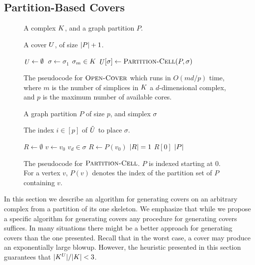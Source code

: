 \subsection{Partition-Based Covers}

\label{sec:partition-based-covers}
\label{sec:pcover}
\begin{figure}[h!]
\begin{description}
\addtolength{\itemsep}{-.65\baselineskip}
\item[\small\textbf{Input:}] \small A complex $K$, and a graph partition $P$.
\item[\small\textbf{Output:}] \small A cover $U$, of size $|P|+1$.
\end{description}
\vspace{-.6cm}
\begin{codebox}
 \li	$\id{\C} \gets \emptyset$
 \li  \Parfor\,$ \sigma \gets \sigma_1$ \To $\sigma_m \in K$
 \li 	   \Do  $\id{\C}[\sigma] \gets \proc{Partition-Cell}(P,\sigma)$
          \End
 \li \Return \id{\C}
  \End
\end{codebox}
\label{alg:open-cov}
\caption{The pseudocode for $\textnormal{\scshape Open-Cover}$ which runs in $O(md/p)$ time, where $m$ is the 
number of simplices in $K$ a $d$-dimensional complex, and $p$ is the 
maximum number of available cores.}
\end{figure}
\begin{figure}[h!]
\begin{description}
\addtolength{\itemsep}{-.65\baselineskip}
\item[\small \textbf{Input:}] \small A graph partition $P$ of size $p$, and simplex $\sigma$
\item[\small \textbf{Output:}] \small The index $i \in [p]$ of  $\tilde{U}$ to place $\sigma$.
\end{description}
\vspace{-.65cm}
\begin{codebox}
 \li	$R \gets \emptyset$
 \li  \For $v \gets v_0$ \To $v_d \in \sigma$
 \li 	   \Do $R \gets P(v_0)$
          \End
 \li	\If $|R| = 1$ \Return $R[0]$
 \li    \Else \Return $|P|$
\end{codebox}
\caption{The pseudocode for $\textnormal{\scshape Partition-Cell}$. $P$ is indexed starting at 0. For a vertex $v$, $P(v)$ 
denotes the index of the partition set of $P$ containing $v$.}
\end{figure}
In this section we describe an algorithm for generating covers on an 
arbitrary complex from a partition of its one skeleton. We emphasize that while we propose a specific
algorithm for generating covers any procedure for generating covers suffices. In many situations there might be a 
better approach for generating covers than the one presented. Recall that in the worst case, a cover may produce an exponentially large blowup. 
However, the heuristic presented in this section guarantees that $|K^{U}|/|K| < 3$. 

